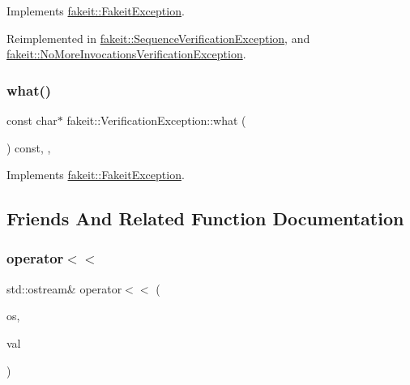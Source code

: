 Implements \mbox{\hyperlink{structfakeit_1_1FakeitException_a02ef6315b98e4382157c2106a62f7718}{fakeit\+::\+Fakeit\+Exception}}.



Reimplemented in \mbox{\hyperlink{structfakeit_1_1SequenceVerificationException_a0346dd2569b455290bde744e57e87e89}{fakeit\+::\+Sequence\+Verification\+Exception}}, and \mbox{\hyperlink{structfakeit_1_1NoMoreInvocationsVerificationException_afbb7a2342bae73503d9fdc0a9f39c343}{fakeit\+::\+No\+More\+Invocations\+Verification\+Exception}}.

\mbox{\label{structfakeit_1_1VerificationException_aba8bb8f60a0427c01868a0ab0388fd0b}} 
\subsubsection{\texorpdfstring{what()}{what()}\hspace{0.1cm}{\footnotesize\ttfamily [2/2]}}
{\footnotesize\ttfamily const char$\ast$ fakeit\+::\+Verification\+Exception\+::what (\begin{DoxyParamCaption}{ }\end{DoxyParamCaption}) const\hspace{0.3cm}{\ttfamily [inline]}, {\ttfamily [override]}, {\ttfamily [virtual]}}



Implements \mbox{\hyperlink{structfakeit_1_1FakeitException_a02ef6315b98e4382157c2106a62f7718}{fakeit\+::\+Fakeit\+Exception}}.



\subsection{Friends And Related Function Documentation}
\mbox{\label{structfakeit_1_1VerificationException_aa98da35f957de7b536fe6755789e97de}} 
\subsubsection{\texorpdfstring{operator$<$$<$}{operator<<}\hspace{0.1cm}{\footnotesize\ttfamily [1/2]}}
{\footnotesize\ttfamily std\+::ostream\& operator$<$$<$ (\begin{DoxyParamCaption}\item[{std\+::ostream \&}]{os,  }\item[{const \mbox{\hyperlink{structfakeit_1_1VerificationException}{Verification\+Exception}} \&}]{val }\end{DoxyParamCaption})\hspace{0.3cm}{\ttfamily [friend]}}

